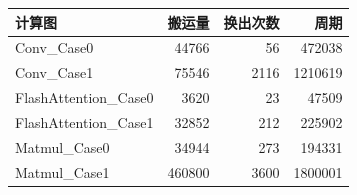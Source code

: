 \begin{tabular}{lrrr}\toprule 计算图 & 搬运量 & 换出次数 & 周期\\\midrule
Conv\_Case0 & 44766 & 56 & 472038 \\
Conv\_Case1 & 75546 & 2116 & 1210619 \\
FlashAttention\_Case0 & 3620 & 23 & 47509 \\
FlashAttention\_Case1 & 32852 & 212 & 225902 \\
Matmul\_Case0 & 34944 & 273 & 194331 \\
Matmul\_Case1 & 460800 & 3600 & 1800001 \\
\bottomrule\end{tabular}
